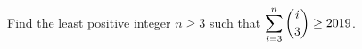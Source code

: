Find the least positive integer $n\ge3$ such that $\displaystyle\sum_{i=3}^{n}\dbinom{i}{3}\ge2019$.
